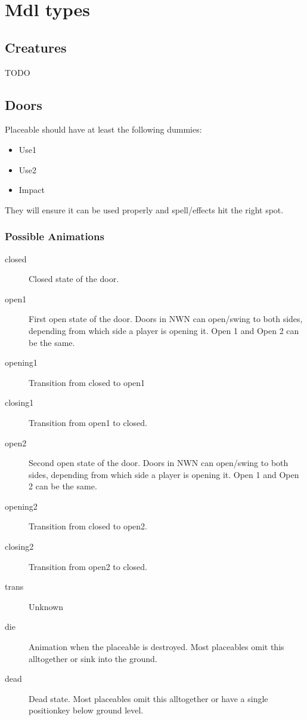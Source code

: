 \section{Mdl types}

\subsection{Creatures}
TODO

\subsection{Doors}
Placeable should have at least the following dummies:
\begin{itemize}
\item Use1
\item Use2
\item Impact
\end{itemize}
They will ensure it can be used properly and spell/effects hit the right spot.

\subsubsection*{Possible Animations}
\begin{description}
    \item[closed] Closed state of the door.
    \item[open1] First open state of the door. Doors in NWN can open/swing to both sides, depending from which side a player is opening it. Open 1 and Open 2 can be the same.
    \item[opening1] Transition from closed to open1
    \item[closing1] Transition from open1 to closed.
    \item[open2] Second open state of the door. Doors in NWN can open/swing to both sides, depending from which side a player is opening it. Open 1 and Open 2 can be the same.
    \item[opening2] Transition from closed to open2.
    \item[closing2] Transition from open2 to closed.
    \item[trans] Unknown
    \item[die] Animation when the placeable is destroyed. Most placeables omit this alltogether or sink into the ground.
    \item[dead] Dead state. Most placeables omit this alltogether or have a single positionkey below ground level.
\end{description}

